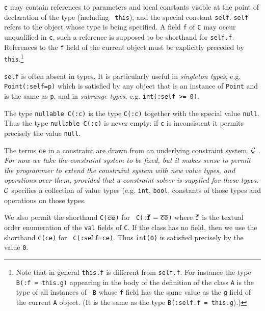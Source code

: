 \documentclass[nocopyrightspace,preprint,10pt]{sigplanconf}
\begin{document}
{\tt c} may contain references to parameters and local constants
visible at the point of declaration of the type (including {\tt
this}), and the special constant {\tt self}.  {\tt self} refers to the
object whose type is being specified. A field {\tt f} of {\tt C} may
occur unqualified in {\tt c}, such a reference is supposed to be
shorthand for {\tt self.f}. References to the {\tt f} field of the
current object must be explicitly preceded by {\tt this}.\footnote{
Note that in general {\tt this.f} is different from {\tt self.f}.  For
instance the type {\tt B(:f = this.g)} appearing in the body of the
definition of the class {\tt A} is the type of all instances of {\tt
B} whose {\tt f} field has the same value as the {\tt g} field of the
current {\tt A} object. (It is the same as the type {\tt B(:self.f =
this.g}).)}

{\tt self} is often absent in types. It is particularly useful in {\em
singleton types}, e.g. {\tt Point(:self=p)} which is satisfied by any
object that is an instance of {\tt Point} and is the same as {\tt p},
and in {\em subrange types}, e.g. {\tt int(:self >= 0)}.


The type {\tt nullable C(:c)} is the type {\tt C(:c)} together with
the special value {\tt null}. Thus the type {\tt nullable C(:c)} is
never empty: if {\tt c} is inconsistent it permits precisely the value
{\tt null}.

The terms {\tt ce} in a constraint are drawn from an underlying
constraint system, $\cal C$ \cite{cccc}. {\em For now we take the
constraint system to be fixed, but it makes sense to permit the
programmer to extend the constraint system with new value types, and
operations over them, provided that a constraint solver is supplied
for these types.} $\cal C$ specifies a collection of value types
(e.g.{} {\tt int}, {\tt bool}, constants of those types and operations
on those types. 

We also permit the shorthand {\tt C($\overline{\tt ce}$)} for {\tt
C(:$\overline{\tt f}=\overline{\tt ce}$)} where $\tt \overline f$ is the textual
order enumeration of the {\tt val} fields of {\tt C}. If the class has
no field, then we use the shorthand {\tt C(ce)} for {\tt
C(:self=ce)}. Thus {\tt int(0)} is satisfied precisely by the value
{\tt 0}.
\end{document}
